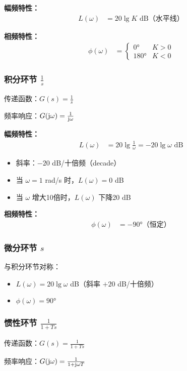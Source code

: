 \textbf{幅频特性：}
\begin{align*}
L(\omega) &= 20\lg K \text{ dB（水平线）}
\end{align*}

\textbf{相频特性：}
\begin{align*}
\phi(\omega) &= \begin{cases}
0° & K > 0 \\
180° & K < 0
\end{cases}
\end{align*}

\subsubsection{积分环节 $\frac{1}{s}$}
传递函数：$G(s) = \frac{1}{s}$

频率响应：$G(\mathrm{j}\omega) = \frac{1}{\mathrm{j}\omega}$

\textbf{幅频特性：}
\begin{align*}
L(\omega) &= 20\lg\frac{1}{\omega} = -20\lg\omega \text{ dB}
\end{align*}
\begin{itemize}
    \item 斜率：$-20$ dB/十倍频（decade）
    \item 当 $\omega = 1$ rad/s 时，$L(\omega) = 0$ dB
    \item 当 $\omega$ 增大10倍时，$L(\omega)$ 下降20 dB
\end{itemize}

\textbf{相频特性：}
\begin{align*}
\phi(\omega) &= -90°\text{（恒定）}
\end{align*}

\subsubsection{微分环节 $s$}
与积分环节对称：
\begin{itemize}
    \item $L(\omega) = 20\lg\omega$ dB（斜率 $+20$ dB/十倍频）
    \item $\phi(\omega) = 90°$
\end{itemize}

\subsubsection{惯性环节 \texorpdfstring{$\frac{1}{1+Ts}$}{1/(1+Ts)}}
传递函数：$G(s) = \frac{1}{1+Ts}$

频率响应：$G(\mathrm{j}\omega) = \frac{1}{1+\mathrm{j}\omega T}$

